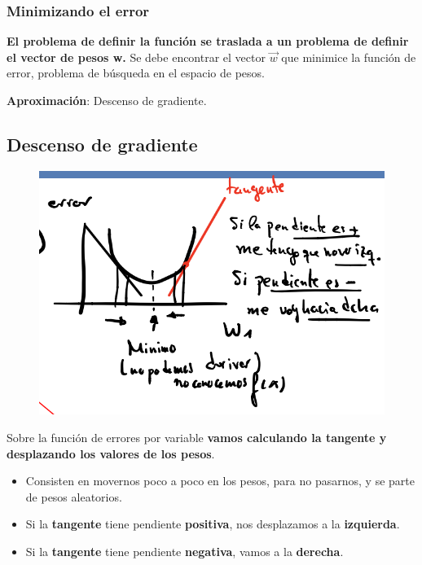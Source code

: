 \documentclass[12pt, twoside, openright]{report} %
\begin{document}
\subsubsection{Minimizando el error}

\textbf{El problema de definir la función se traslada a un problema de
	definir el vector de pesos w.} Se debe encontrar el vector \(\vec{w}\)
que minimice la función de error, problema de búsqueda en el espacio de
pesos.

\textbf{Aproximación}: Descenso de gradiente.

\subsection{Descenso de gradiente}
\begin{figure}[H]
	{\includegraphics[scale=.3]{image-20210305214445428.png}}
\end{figure}
Sobre la función de errores por variable \textbf{vamos calculando la tangente y desplazando los valores de los pesos}.

\begin{itemize}
	\item Consisten en movernos poco a poco en los pesos, para no pasarnos, y se parte de pesos aleatorios.
	\item Si la \textbf{tangente} tiene pendiente \textbf{positiva}, nos
	      desplazamos a la \textbf{izquierda}.
	\item Si la \textbf{tangente} tiene pendiente \textbf{negativa}, vamos a la
	      \textbf{derecha}.
\end{itemize}
\end{document}
